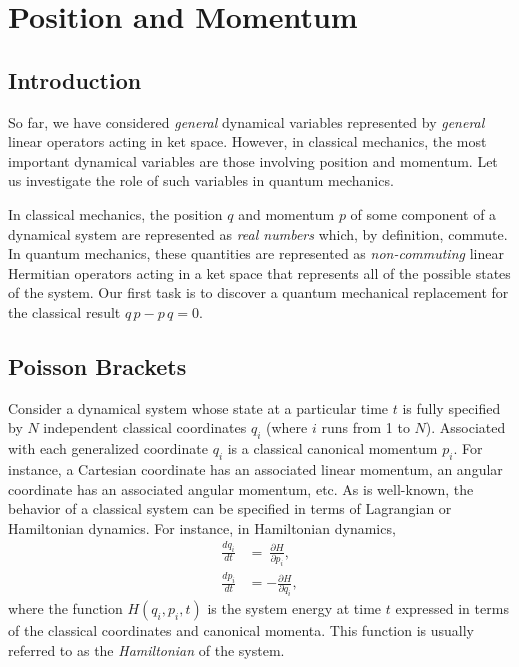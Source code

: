 \chapter{Position and Momentum}

\section{Introduction}
So far, we have considered {\em general}\/ dynamical variables represented by 
{\em general}\/ linear
operators acting in ket space. However, in classical mechanics, the most important
dynamical variables are those involving
position and momentum. Let us investigate 
the role of such  variables  in quantum mechanics. 

In classical mechanics, the position $q$ and momentum $p$ 
of some component of a dynamical  system are represented as {\em real numbers} which,
by definition, commute.
In quantum mechanics, these quantities are represented
as   {\em non-commuting}\/ linear Hermitian operators acting in a ket space
that represents all of the possible states of the system. Our first task is
to discover a quantum mechanical replacement for the classical result
$q\,p-p\,q = 0$.  

\section{Poisson Brackets}
Consider a dynamical system whose state at a particular time $t$ is
fully specified 
by $N$ independent classical  coordinates $q_i$ (where $i$ runs from 1 to $N$). 
Associated with each generalized coordinate $q_i$ is a 
classical canonical momentum
$p_i$. For instance, a Cartesian coordinate  has an associated linear
momentum, an angular coordinate has an associated angular momentum, {\rm etc}.
As is well-known, the behavior of a classical system can be specified in terms
of Lagrangian or Hamiltonian dynamics. For instance, in Hamiltonian dynamics,
\begin{align}\label{e2.1e}
\frac{d q_i}{d t} &= ~\frac{\partial H}{\partial p_i},\\[0.5ex]
\frac{d p_i}{dt} &= - \frac{\partial H}{\partial q_i},\label{e2.2e}
\end{align}
where the function $H(q_i, p_i, t)$ is the system energy  at time $t$
expressed in terms of the 
classical coordinates and canonical momenta. This function is
usually referred to as the {\em Hamiltonian}\/ of the system.

